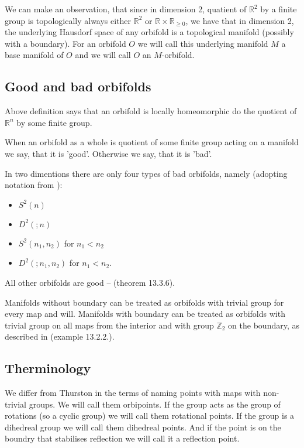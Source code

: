 We can make an observation, that since in dimension 2, quatient of $\mathbb{R}^2$ by a finite 
group is topologically always either $\mathbb{R}^2$ or $\mathbb{R}\times\mathbb{R}_{\geq 0}$, 
we have that in dimension 2, the underlying Hausdorf space of any orbifold is a topological 
manifold (possibly with a boundary). For an orbifold $O$ we will call this underlying manifold $M$
a base manifold of $O$ and we will call $O$ an $M$-orbifold.  

\subsection{Good and bad orbifolds}
Above definition says that an orbifold is locally homeomorphic do the quotient of $\mathbb{R}^n$ 
by some finite group. 

When an orbifold as a whole is quotient of some finite group acting on a manifold we say, that 
it is 'good'. Otherwise we say, that it is 'bad'. 


In two dimentions there are only four types of bad orbifolds, namely
(adopting notation from \cite{Thurston1979}): 
\begin{itemize}
\item $S^2(n)$ 
\item $D^2(;n)$ 
\item $S^2(n_1,n_2)$ for $n_1 < n_2$ 
\item $D^2(;n_1,n_2)$ for $n_1 < n_2$. 
\end{itemize}
All other orbifolds are good -- \cite{Thurston1979} (theorem 13.3.6).


Manifolds without boundary can be treated as orbifolds with trivial group for every map and will. 
Manifolds with boundary can be treated as orbifolds with trivial group on all maps from the 
interior and with group $\mathbb{Z}_2$ on the boundary, as described in \cite{Thurston1979} 
(example 13.2.2.).

\subsection{Therminology}
We differ from Thurston in the terms of naming points with maps with non-trivial groups. 
We will call them orbipoints. If the group acts as the group of rotations (so a 
cyclic group) we will call them rotational points. If the group is a dihedreal group we will 
call them 
dihedreal points. And if the point is on the boundry that stabilises reflection we will call it a 
reflection point. 

